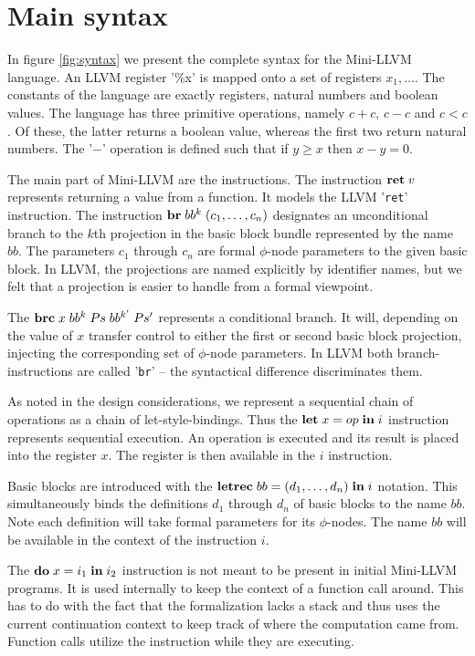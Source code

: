\documentclass[a4paper, oneside, 10pt, draft]{memoir}
\begin{document}
\section{Main syntax}

In figure \ref{fig:syntax} we present the complete syntax for the
Mini-LLVM language. An LLVM register '\%x' is mapped onto a set of
registers $x_1, \dotsc$. The constants of the language are exactly
registers, natural numbers and boolean values. The language has three
primitive operations, namely $c + c$, $c - c$ and $c < c$. Of these,
the latter returns a boolean value, whereas the first two return
natural numbers. The '$-$' operation is defined such that if $y \geq x$
then $x - y = 0$.

The main part of Mini-LLVM are the instructions. The instruction
$\mathbf{ret} \; v$ represents returning a value from a function. It models the
LLVM '\texttt{ret}' instruction. The instruction $\mathbf{br} \; bb^k \; (c_1,
  \dotsc, c_n)$ designates an unconditional branch to the $k$th
projection in the basic block bundle represented by the name $bb$. The
parameters $c_1$ through $c_n$ are formal $\phi$-node parameters to
the given basic block. In LLVM, the projections are named explicitly
by identifier names, but we felt that a projection is easier to handle
from a formal viewpoint.

The $\mathbf{brc} \; x \; bb^k \; Ps \; bb^{k'} \; Ps'$ represents a conditional
branch. It will, depending on the value of $x$ transfer control to
either the first or second basic block projection, injecting the
corresponding set of $\phi$-node parameters. In LLVM both
branch-instructions are called '\texttt{br}' -- the syntactical
difference discriminates them.

As noted in the design considerations, we represent a sequential chain
of operations as a chain of let-style-bindings. Thus the
$\mathbf{let} \; x = op \; \mathbf{in} \; i$ instruction represents sequential execution. An
operation is executed and its result is placed into the register
$x$. The register is then available in the $i$ instruction.

Basic blocks are introduced with the $\mathbf{letrec} \; bb = (d_1, \dotsc,
  d_n) \; \mathbf{in} \; i$ notation. This simultaneously binds the definitions $d_1$
through $d_n$ of basic blocks to the name $bb$. Note each definition will
take formal parameters for its $\phi$-nodes. The name $bb$ will be
available in the context of the instruction $i$.

The $\mathbf{do} \; x = i_1 \; \mathbf{in} \; i_2$ instruction is not meant to be present in
initial Mini-LLVM programs. It is used internally to keep the context
of a function call around. This has to do with the fact that the
formalization lacks a stack and thus uses the current continuation
context to keep track of where the computation came from. Function
calls utilize the instruction while they are executing.
\end{document}
